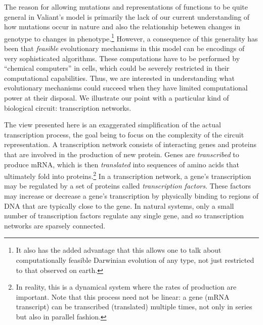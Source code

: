 \documentclass{acmtr2e}
\begin{document}
The reason for allowing mutations and representations of functions to be quite
general in Valiant's model is primarily the lack of our current understanding of
how mutations occur in nature and also the relationship betewen changes in genotype to
changes in phenotype.\footnote{It also has the added advantage that this allows
one to talk about computationally feasible Darwinian evolution of any type, not
just restricted to that observed on earth.} However, a consequence of this
generality has been that \emph{feasible} evolutionary mechanisms in this model
can be encodings of very sophisticated algorithms. These computations
have to be performed by ``chemical computers'' in cells, which could be severely
restricted in their computational capabilities. Thus, we are interested in
understanding what evolutionary mechanisms could succeed when they have limited
computational power at their disposal. We illustrate our point with a particular
kind of biological circuit: transcription networks.

The view presented here is an exaggerated simplification of the actual
transcription process, the goal being to focus on the complexity of the circuit
representation. A transcription network consists of 
interacting genes and proteins that are involved in the production of new
protein. Genes are \emph{transcribed} to produce mRNA, which is then
\emph{translated} into sequences of amino acids that ultimately fold into
proteins.\footnote{In reality, this is a dynamical system where the rates of
production are important. Note that this process need not be linear: a gene (mRNA
transcript) can be transcribed (translated) multiple times, not only in series
but also in parallel fashion.}
In a transcription network, a gene's transcription may be regulated by a set of
proteins called \emph{transcription factors}.
These factors may increase or decrease a gene's transcription by
physically binding to regions of DNA that are typically close to the gene.
In natural systems, only a small number of transcription factors
regulate any single gene, and so transcription networks are sparsely connected.
\end{document}
